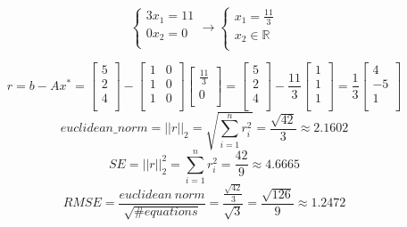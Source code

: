 \documentclass[unicode,11pt,a4paper,oneside,numbers=endperiod,openany]{scrartcl}
\begin{document}
\begin{equation*}
    \begin{cases} 3x_1 = 11 \\ 0x_2 = 0  \\ \end{cases}
    \rightarrow
    \begin{cases} x_1 = \frac{11}{3} \\ x_2 \in \mathbb{R} \\ \end{cases}
\end{equation*}

\[
    r
    = b - Ax^*
    = \begin{bmatrix} 5 \\ 2 \\ 4\\ \end{bmatrix}
    -
    \begin{bmatrix} 1 & 0 \\ 1 & 0 \\ 1 & 0 \\ \end{bmatrix}
    \begin{bmatrix} \frac{11}{3} \\ 0\\ \end{bmatrix}
    =
    \begin{bmatrix} 5 \\ 2 \\ 4\\ \end{bmatrix}
    -
    \frac{11}{3} \begin{bmatrix} 1 \\ 1\\ 1\\ \end{bmatrix}
    =
    \frac{1}{3} \begin{bmatrix} 4 \\ -5 \\ 1\\ \end{bmatrix}
\]
\[
    euclidean\_norm
    = ||r||_2 = \sqrt{\sum_{i=1}^{n}r_i^2}
    = \frac{\sqrt{42}}{3}
    \approx 2.1602
\]
\[
    SE
    = ||r||_2^2 = \sum_{i=1}^{n}r_i^2
    = \frac{42}{9}
    \approx 4.6665
\]
\[
    RMSE
    = \frac{euclidean\ norm}{\sqrt{\# equations}}
    = \frac{\frac{\sqrt{42}}{3}}{\sqrt{3}}
    = \frac{\sqrt{126}}{9}
    \approx 1.2472
\]
\end{document}
